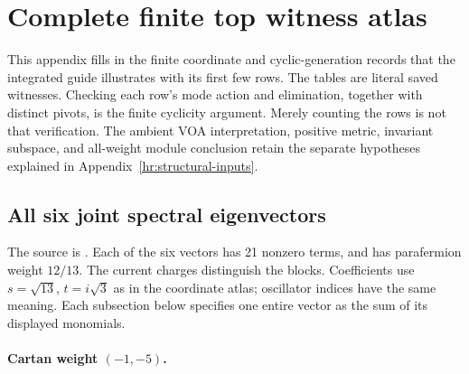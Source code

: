 \section{Complete finite top witness atlas}
\label{expdata:top-atlas}
This appendix fills in the finite coordinate and cyclic-generation
records that the integrated guide illustrates with its first few rows.
The tables are literal saved witnesses. Checking each row's mode action
and elimination, together with distinct pivots, is the finite cyclicity
argument. Merely counting the rows is not that verification. The ambient
VOA interpretation, positive metric, invariant subspace, and all-weight
module conclusion retain the separate hypotheses explained in
Appendix~\ref{hr:structural-inputs}.

\subsection{All six joint spectral eigenvectors}
The source is
.
Each of the six vectors has 21 nonzero terms, and has parafermion weight
$12/13$. The current charges distinguish the blocks. Coefficients use
$s=\sqrt{13}$, $t=i\sqrt3$ as in the coordinate atlas; oscillator indices
have the same meaning. Each subsection below specifies one entire vector
as the sum of its displayed monomials.
\paragraph{Cartan weight $(-1,-5)$.}


